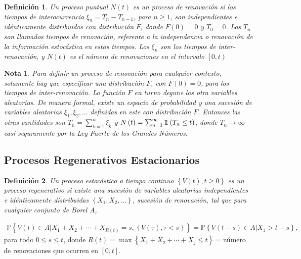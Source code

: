\documentclass{article}
\newtheorem{Def}{Definición}[section]
\newtheorem{Note}{Nota}[section]
\newcommand{\prob}{\mathbb{P}}
\newcommand{\indora}{\mbox{$1$\hspace{-0.8ex}$1$}}
\numberwithin{equation}{section}
\begin{document}
\begin{Def}
Un proceso puntual $N\left(t\right)$ es un proceso de renovaci\'on si los tiempos de interocurrencia $\xi_{n}=T_{n}-T_{n-1}$, para $n\geq1$, son independientes e id\'enticamente distribuidos con distribuci\'on $F$, donde $F\left(0\right)=0$ y $T_{0}=0$. Los $T_{n}$ son llamados tiempos de renovaci\'on, referente a la independencia o renovaci\'on de la informaci\'on estoc\'astica en estos tiempos. Los $\xi_{n}$ son los tiempos de inter-renovaci\'on, y $N\left(t\right)$ es el n\'umero de renovaciones en el intervalo $\left[0,t\right)$
\end{Def}


\begin{Note}
Para definir un proceso de renovaci\'on para cualquier contexto, solamente hay que especificar una distribuci\'on $F$, con $F\left(0\right)=0$, para los tiempos de inter-renovaci\'on. La funci\'on $F$ en turno degune las otra variables aleatorias. De manera formal, existe un espacio de probabilidad y una sucesi\'on de variables aleatorias $\xi_{1},\xi_{2},\ldots$ definidas en este con distribuci\'on $F$. Entonces las otras cantidades son $T_{n}=\sum_{k=1}^{n}\xi_{k}$ y $N\left(t\right)=\sum_{n=1}^{\infty}\indora\left(T_{n}\leq t\right)$, donde $T_{n}\rightarrow\infty$ casi seguramente por la Ley Fuerte de los Grandes N\'umeros.
\end{Note}

\subsection*{Procesos Regenerativos Estacionarios}

\begin{Def}
Un proceso estoc\'astico a tiempo continuo $\left\{V\left(t\right),t\geq0\right\}$ es un proceso regenerativo si existe una sucesi\'on de variables aleatorias independientes e id\'enticamente distribuidas $\left\{X_{1},X_{2},\ldots\right\}$, sucesi\'on de renovaci\'on, tal que para cualquier conjunto de Borel $A$, 
\end{Def}

\begin{eqnarray}
\prob\left\{V\left(t\right)\in A|X_{1}+X_{2}+\cdots+X_{R\left(t\right)}=s,\left\{V\left(\tau\right),\tau<s\right\}\right\}=\prob\left\{V\left(t-s\right)\in A|X_{1}>t-s\right\},
\end{eqnarray}
para todo $0\leq s\leq t$, donde $R\left(t\right)=\max\left\{X_{1}+X_{2}+\cdots+X_{j}\leq t\right\}=$n\'umero de renovaciones que ocurren en $\left[0,t\right]$.
\end{document}
